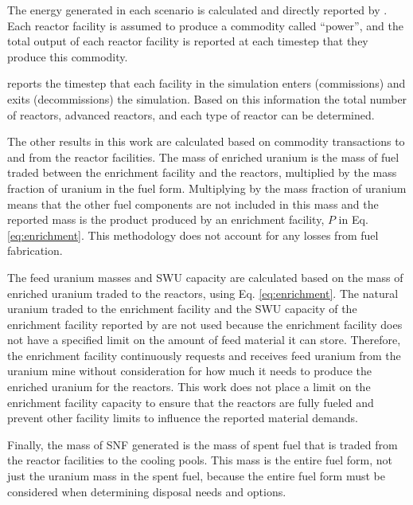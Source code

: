 The energy generated in each scenario is calculated and directly 
reported by \Cyclus. Each reactor facility is assumed to produce a 
commodity called ``power'', and the total output of each reactor facility 
is reported at each timestep that they produce this commodity. 

\Cyclus reports the timestep that each facility in the simulation enters 
(commissions) and exits (decommissions) the simulation. Based on 
this information the total number of reactors, advanced reactors, and 
each type of reactor can be determined. 

The other results in this work are calculated based on commodity 
transactions to and from the reactor facilities. The mass of enriched 
uranium is the mass of fuel traded between the enrichment facility and 
the reactors, multiplied by the mass fraction of uranium in the fuel 
form. Multiplying by the mass fraction of uranium means that the other 
fuel components are not included in this mass and the reported mass is 
the product produced by an enrichment facility, $P$ in Eq. 
\ref{eq:enrichment}. This methodology does not account for any 
losses from fuel fabrication.

The feed uranium masses and \gls{SWU} capacity are calculated 
based on the mass of enriched uranium traded to the reactors, using 
Eq. \ref{eq:enrichment}. The natural uranium traded to the enrichment 
facility and the \gls{SWU} capacity of the enrichment facility reported 
by 
\Cyclus are not used because the enrichment facility does not have a 
specified limit on the amount of feed material it can store. Therefore, 
the enrichment facility continuously requests and receives feed 
uranium from the uranium mine without consideration for how much it needs 
to produce the enriched uranium for the reactors. This work does not 
place a limit on the enrichment facility capacity to ensure that the 
reactors are fully fueled and prevent other facility limits to 
influence the reported material demands. 

Finally, the mass of \gls{SNF} generated is the mass of spent fuel that is 
traded from the reactor facilities to the cooling pools. This mass is the 
entire fuel form, not just the uranium mass in the spent fuel, because 
the entire fuel form must be considered when determining disposal needs 
and options. 
